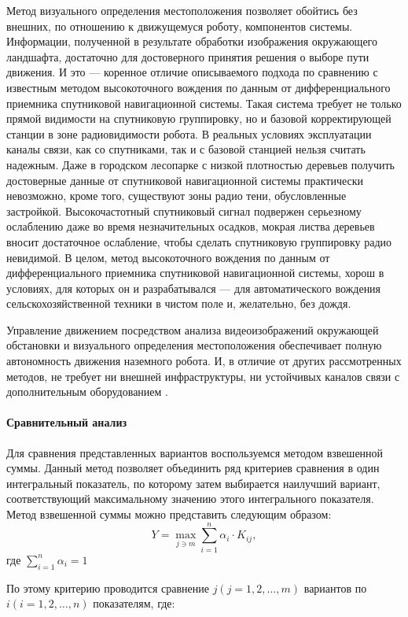 Метод визуального определения местоположения позволяет обойтись без внешних, по отношению к движущемуся роботу, компонентов системы. Информации, полученной в результате обработки изображения окружающего ландшафта, достаточно для достоверного принятия решения о выборе пути движения. И это — коренное отличие описываемого подхода по сравнению с известным методом высокоточного вождения по данным от дифференциального приемника спутниковой навигационной системы. Такая система требует не только прямой видимости на спутниковую группировку, но и базовой корректирующей станции в зоне радиовидимости робота. В реальных условиях эксплуатации каналы связи, как со спутниками, так и с базовой станцией нельзя считать надежным. Даже в городском лесопарке с низкой плотностью деревьев получить достоверные данные от спутниковой навигационной системы практически невозможно, кроме того, существуют зоны радио тени, обусловленные застройкой. Высокочастотный спутниковый сигнал подвержен серьезному ослаблению даже во время незначительных осадков, мокрая листва деревьев вносит достаточное ослабление, чтобы сделать спутниковую группировку радио невидимой. В целом, метод высокоточного вождения по данным от дифференциального приемника спутниковой навигационной системы, хорош в условиях, для которых он и разрабатывался — для автоматического вождения сельскохозяйственной техники в чистом поле и, желательно, без дождя.

Управление движением посредством анализа видеоизображений окружающей обстановки и визуального определения местоположения обеспечивает полную автономность движения наземного робота. И, в отличие от других рассмотренных методов, не требует ни внешней инфраструктуры, ни устойчивых каналов связи с дополнительным оборудованием \cite{spmrobotics}.


\paragraph{Сравнительный анализ}

Для сравнения представленных вариантов воспользуемся методом взвешенной суммы. Данный метод позволяет объединить ряд критериев сравнения в один интегральный показатель, по которому затем выбирается наилучший вариант, соответствующий максимальному значению этого интегрального показателя. Метод взвешенной суммы можно представить следующим образом: 
$$ Y = \max_{j \ni m} \displaystyle\sum_{i=1}^{n} \alpha_i \cdot K_{ij},$$
где $\sum_{i=1}^{n} \alpha_i = 1$

По этому критерию проводится сравнение $j (j = 1, 2, …, m)$ вариантов по $i (i = 1, 2, …, n)$ показателям, где:

